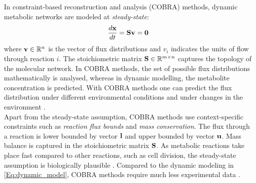 In constraint-based reconstruction and analysis (COBRA) methods, dynamic metabolic networks are modeled at \textit{steady-state}: 
\begin{equation*}
    \frac{d \bold x}{dt} = \bold S \bold v= \bold 0 
\end{equation*} 
\quad where $\bold v \in \mathbb{R}^n$ is the vector of flux distributions and $v_i$ indicates the units of flow through reaction $i$. The stoichiometric matrix $\bold S \in \mathbb{R}^{m \times n}$ captures the topology of the molecular network. In COBRA methods, the set of possible flux distributions mathematically is analysed, whereas in dynamic modelling, the metabolite concentration is predicted. With COBRA methods one can predict the flux distribution under different environmental conditions and under changes in the environment \cite{intro_computational_systems_biology}.
\\
Apart from the steady-state assumption, COBRA methods use context-specific constraints such as \textit{reaction flux bounds} and \textit{mass conservation}. %
The flux through a reaction is lower bounded by vector $\bold l$ and upper bounded by vector $\bold u$. Mass balance is captured in the stoichiometric matrix $\bold S$. 
As metabolic reactions take place fast compared to other reactions, such as cell division, the steady-state assumption is biologically plausible \cite{enumerate_extreme_rays}. Compared to the dynamic modeling in \cref{Eq:dynamic_model}, COBRA methods require much less experimental data \cite{intro_computational_systems_biology}.\\
